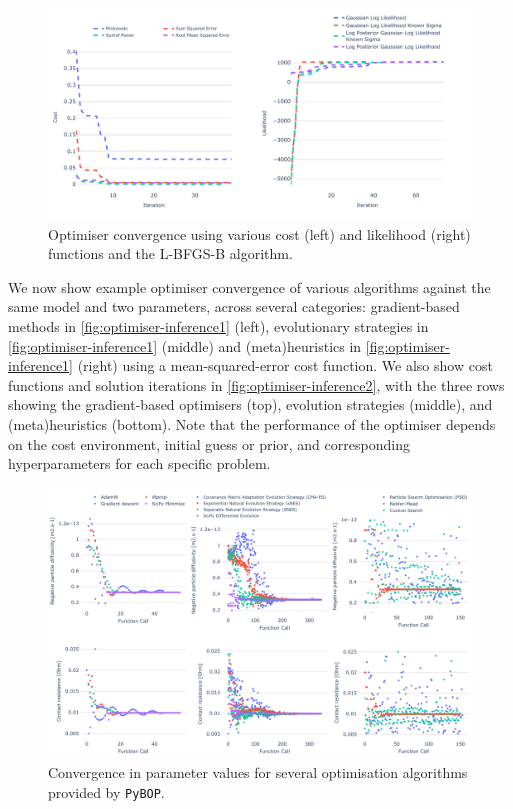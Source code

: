 \documentclass[
]{article}
\begin{document}
\begin{figure}
\centering
\includegraphics[width=1\textwidth,height=\textheight]{figures/joss/converge.pdf}
\caption{Optimiser convergence using various cost (left) and likelihood
(right) functions and the L-BFGS-B algorithm.
\label{fig:convergence-min-max}}
\end{figure}

We now show example optimiser convergence of various algorithms against
the same model and two parameters, across several categories:
gradient-based methods in \autoref{fig:optimiser-inference1} (left),
evolutionary strategies in \autoref{fig:optimiser-inference1} (middle)
and (meta)heuristics in \autoref{fig:optimiser-inference1} (right) using
a mean-squared-error cost function. We also show cost functions and
solution iterations in \autoref{fig:optimiser-inference2}, with the
three rows showing the gradient-based optimisers (top), evolution
strategies (middle), and (meta)heuristics (bottom). Note that the
performance of the optimiser depends on the cost environment, initial
guess or prior, and corresponding hyperparameters for each specific
problem.

\begin{figure}[htb]
\centering
\includegraphics[width=1\textwidth,height=\textheight]{figures/joss/optimisers_parameters.pdf}
\caption{Convergence in parameter values for several optimisation
algorithms provided by \texttt{PyBOP}. \label{fig:optimiser-inference1}}
\end{figure}
\end{document}
